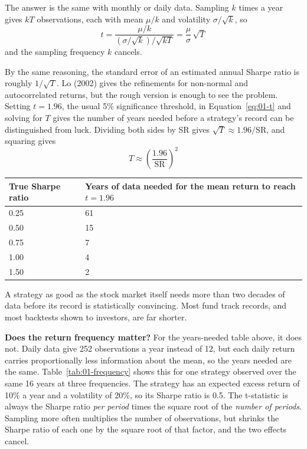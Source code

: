 The answer is the same with monthly or daily data. Sampling $k$ times a year gives $kT$ observations, each with mean $\mu/k$ and volatility $\sigma/\sqrt{k}$, so
\begin{equation}
  t = \frac{\mu/k}{(\sigma/\sqrt{k})/\sqrt{kT}} = \frac{\mu}{\sigma}\,\sqrt{T} \nonumber
\end{equation}
and the sampling frequency $k$ cancels.

By the same reasoning, the standard error of an estimated annual Sharpe ratio is roughly $1/\sqrt{T}$. Lo (2002) gives the refinements for non-normal and autocorrelated returns, but the rough version is enough to see the problem. Setting $t = 1.96$, the usual 5\% significance threshold, in Equation~\eqref{eq:01-t} and solving for $T$ gives the number of years needed before a strategy's record can be distinguished from luck. Dividing both sides by SR gives $\sqrt{T} \approx 1.96/\mathrm{SR}$, and squaring gives
\begin{equation}
  T \approx \left(\frac{1.96}{\mathrm{SR}}\right)^2
  \label{eq:01-T}
\end{equation}

\begin{center}
\small
\begin{tabular}{@{}ll@{}}
\toprule
True Sharpe ratio & Years of data needed for the mean return to reach $t = 1.96$ \\
\midrule
0.25 & 61 \\
0.50 & 15 \\
0.75 & 7 \\
1.00 & 4 \\
1.50 & 2 \\
\bottomrule
\end{tabular}
\end{center}

A strategy as good as the stock market itself needs more than two decades of data before its record is statistically convincing. Most fund track records, and most backtests shown to investors, are far shorter.

\textbf{Does the return frequency matter?} For the years-needed table above, it does not. Daily data give 252 observations a year instead of 12, but each daily return carries proportionally less information about the mean, so the years needed are the same. Table~\ref{tab:01-frequency} shows this for one strategy observed over the same 16 years at three frequencies. The strategy has an expected excess return of 10\% a year and a volatility of 20\%, so its Sharpe ratio is 0.5. The t-statistic is always the Sharpe ratio \emph{per period} times the square root of the \emph{number of periods}. Sampling more often multiplies the number of observations, but shrinks the Sharpe ratio of each one by the square root of that factor, and the two effects cancel.

